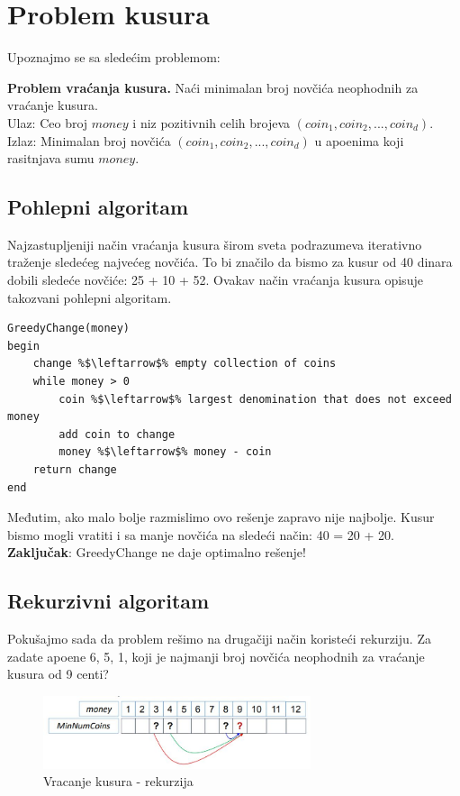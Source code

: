 


\section{Problem kusura}

\noindent Upoznajmo se sa sledećim problemom:

\begin{tcolorbox}\textbf{Problem vraćanja kusura.}
	Naći minimalan broj novčića neophodnih za vraćanje kusura. \\
	Ulaz: Ceo broj $money$ i niz pozitivnih celih brojeva $(coin_1, coin_2, ..., coin_d)$. \\
	Izlaz: Minimalan broj novčića $(coin_1, coin_2, ..., coin_d)$ u apoenima koji rasitnjava sumu $money$. 
\end{tcolorbox}

\subsection{Pohlepni algoritam}

Najzastupljeniji način vraćanja kusura širom sveta podrazumeva iterativno traženje sledećeg najvećeg novčića. To bi značilo da bismo za kusur od 40 dinara dobili sledeće novčiće: 25 + 10 + 52. Ovakav način vraćanja kusura opisuje takozvani pohlepni algoritam. \\

\begin{lstlisting}
GreedyChange(money)
begin
    change %$\leftarrow$% empty collection of coins
	while money > 0
		coin %$\leftarrow$% largest denomination that does not exceed money
		add coin to change
		money %$\leftarrow$% money - coin
	return change
end
\end{lstlisting}

Međutim, ako malo bolje razmislimo ovo rešenje zapravo nije najbolje. Kusur bismo mogli vratiti i sa manje novčića na sledeći način: 40 = 20 + 20. \textbf{Zaključak}: GreedyChange ne daje optimalno rešenje!

\subsection{Rekurzivni algoritam}

Pokušajmo sada da problem rešimo na drugačiji način koristeći rekurziju. Za zadate apoene 6, 5, 1, koji je najmanji broj novčića neophodnih za vraćanje kusura od 9 centi?

\begin{figure}[h!]
\centering
\includegraphics[width=0.7\textwidth]{poglavlja/5/slike/rekurzija1.JPG}
\caption{Vracanje kusura - rekurzija}
\label{slika:rekurzija}
\end{figure}

